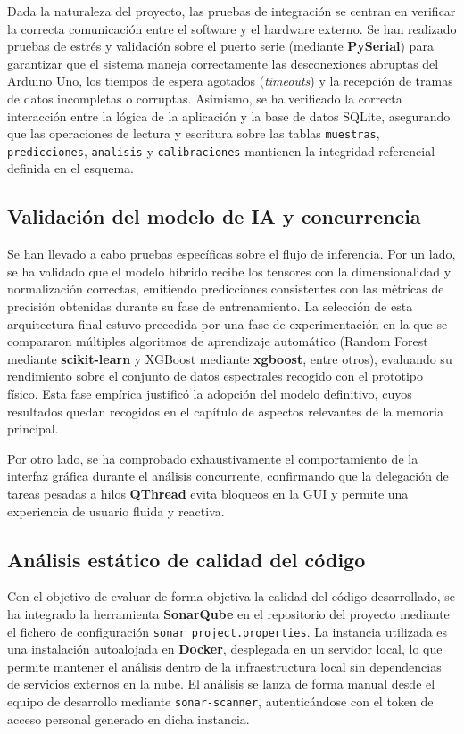Dada la naturaleza del proyecto, las pruebas de integración se centran en
verificar la correcta comunicación entre el software y el hardware externo.
Se han realizado pruebas de estrés y validación sobre el puerto serie
(mediante \textbf{PySerial}) para garantizar que el sistema maneja
correctamente las desconexiones abruptas del Arduino Uno, los tiempos de
espera agotados (\textit{timeouts}) y la recepción de tramas de datos
incompletas o corruptas. Asimismo, se ha verificado la correcta interacción
entre la lógica de la aplicación y la base de datos SQLite, asegurando que
las operaciones de lectura y escritura sobre las tablas \texttt{muestras},
\texttt{predicciones}, \texttt{analisis} y \texttt{calibraciones} mantienen
la integridad referencial definida en el esquema.

\subsection*{Validación del modelo de IA y concurrencia}

Se han llevado a cabo pruebas específicas sobre el flujo de inferencia. Por
un lado, se ha validado que el modelo híbrido recibe los tensores con
la dimensionalidad y normalización correctas, emitiendo predicciones
consistentes con las métricas de precisión obtenidas durante su fase de
entrenamiento. La selección de esta arquitectura final estuvo precedida por una fase
de experimentación en la que se compararon múltiples algoritmos de
aprendizaje automático (Random Forest mediante \textbf{scikit-learn} y 
XGBoost mediante \textbf{xgboost}, entre otros), evaluando su rendimiento 
sobre el conjunto de datos espectrales recogido con el prototipo físico. 
Esta fase empírica justificó la adopción del modelo definitivo, cuyos resultados quedan recogidos 
en el capítulo de aspectos relevantes de la memoria principal.

Por otro lado, se ha comprobado exhaustivamente el comportamiento de la
interfaz gráfica durante el análisis concurrente, confirmando que la
delegación de tareas pesadas a hilos \textbf{QThread} evita bloqueos en
la GUI y permite una experiencia de usuario fluida y reactiva.

\subsection*{Análisis estático de calidad del código}

Con el objetivo de evaluar de forma objetiva la calidad del código
 desarrollado, se ha integrado la herramienta \textbf{SonarQube\cite{sonarqube2024docs}} en el
repositorio del proyecto mediante el fichero de configuración
\texttt{sonar\_project.properties}. La instancia utilizada es una instalación
autoalojada en \textbf{Docker}, desplegada en un servidor local, lo que permite mantener el análisis
dentro de la infraestructura local sin dependencias de servicios externos
en la nube. El análisis se lanza de forma manual desde el equipo de desarrollo
mediante \texttt{sonar-scanner}, autenticándose con el token de acceso personal
generado en dicha instancia.

